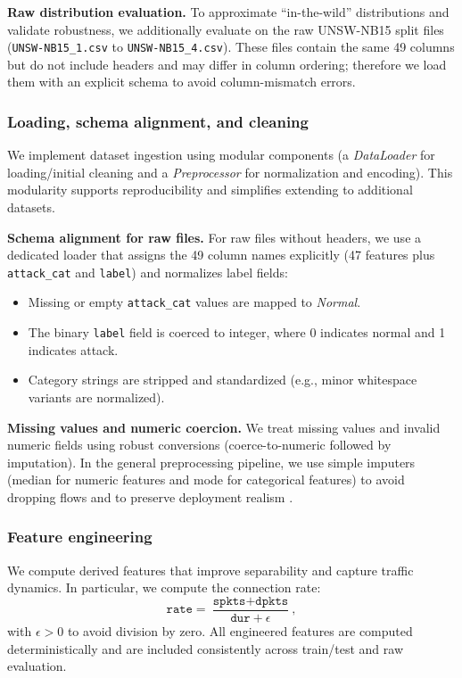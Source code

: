 \textbf{Raw distribution evaluation.} To approximate ``in-the-wild'' distributions and validate robustness, we additionally evaluate on the raw UNSW-NB15 split files (\texttt{UNSW-NB15\_1.csv} to \texttt{UNSW-NB15\_4.csv}). These files contain the same 49 columns but do not include headers and may differ in column ordering; therefore we load them with an explicit schema to avoid column-mismatch errors.

\subsubsection{Loading, schema alignment, and cleaning}
We implement dataset ingestion using modular components (a \emph{DataLoader} for loading/initial cleaning and a \emph{Preprocessor} for normalization and encoding). This modularity supports reproducibility and simplifies extending to additional datasets.

\textbf{Schema alignment for raw files.} For raw files without headers, we use a dedicated loader that assigns the 49 column names explicitly (47 features plus \texttt{attack\_cat} and \texttt{label}) and normalizes label fields:
\begin{itemize}
  \item Missing or empty \texttt{attack\_cat} values are mapped to \emph{Normal}.
  \item The binary \texttt{label} field is coerced to integer, where 0 indicates normal and 1 indicates attack.
  \item Category strings are stripped and standardized (e.g., minor whitespace variants are normalized).
\end{itemize}

\textbf{Missing values and numeric coercion.} We treat missing values and invalid numeric fields using robust conversions (coerce-to-numeric followed by imputation). In the general preprocessing pipeline, we use simple imputers (median for numeric features and mode for categorical features) to avoid dropping flows and to preserve deployment realism \cite{Pedregosa2011Scikit}.

\subsubsection{Feature engineering}
We compute derived features that improve separability and capture traffic dynamics. In particular, we compute the connection rate:
\begin{equation}
\texttt{rate} = \frac{\texttt{spkts}+\texttt{dpkts}}{\texttt{dur}+\epsilon},
\end{equation}
with $\epsilon>0$ to avoid division by zero. All engineered features are computed deterministically and are included consistently across train/test and raw evaluation.


